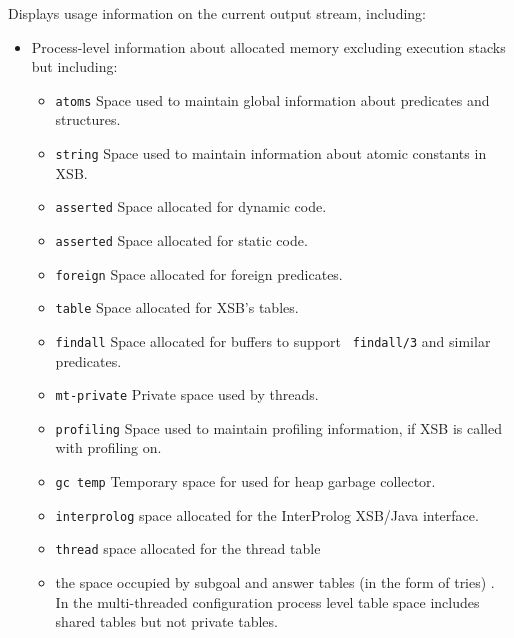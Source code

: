 \begin{description}

%
Displays usage information on the current output stream, including: 
\begin{itemize} 
\item Process-level information about allocated memory excluding
  execution stacks but including: 
\begin{itemize}
\item {\tt atoms} Space used to maintain global information about
  predicates and structures. 
%
\item {\tt string} Space used to maintain information about atomic
  constants in XSB.
%
\item {\tt asserted} Space allocated for dynamic code.
%
\item {\tt asserted} Space allocated for static code.
%
\item {\tt foreign} Space allocated for foreign predicates.
%
\item {\tt table} Space allocated for XSB's tables.
%
\item {\tt findall} Space allocated for buffers to support {\tt
  findall/3} and similar predicates.
%
\item {\tt mt-private} Private space used by threads.
%
\item {\tt profiling} Space used to maintain profiling information, if
  XSB is called with profiling on.
%
\item {\tt gc temp} Temporary space for used for heap garbage
  collector.
%
\item {\tt interprolog} space allocated for the InterProlog XSB/Java
  interface.
%
\item {\tt thread} space allocated for the thread table
%
\item the space occupied by subgoal and answer tables (in the form of
  tries) \cite{RRSSW98,CuSW99b,TST99}.  In the multi-threaded
  configuration process level table space includes shared tables but
  not private tables.
\end{itemize}


\end{itemize}
\end{description}
